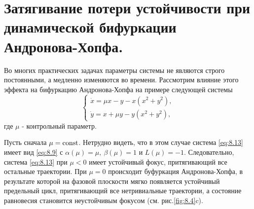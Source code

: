 \section{Затягивание потери устойчивости при динамической бифуркации Андронова-Хопфа.}%
\label{sec:8.4}

Во многих практических задачах параметры системы не являются строго
постоянными, а медленно изменяются во времени. Рассмотрим влияние этого
эффекта на бифуркацию Андронова-Хопфа на примере следующей системы
\begin{equation}
        \label{eq:8.13}
        \begin{cases}
                \dot x = \mu x - y - x(x^2+y^2),\\
                \dot y = x + \mu y - y(x^2+y^2),
        \end{cases}
\end{equation}
где $\mu$ - контрольный параметр.

Пусть сначала $\mu = \textrm{const}$. Нетрудно видеть, что в этом случае система
\eqref{eq:8.13} имеет вид \eqref{eq:8.9} с $\alpha(\mu) = \mu,~\beta(\mu)=1$ и $L(\mu)=-1$.
Следовательно, система \eqref{eq:8.13} при $\mu<0$ имеет устойчивый фокус,
притягивающий все остальные траектории.  При $\mu=0$ происходит буфуркация Андронова-Хопфа, в результате которой на фазовой плоскости мягко появляется устойчивый предельный цикл,
притягивающий все нетривиальные траектории, а состояние равновесия становится неустойчивым фокусом
(см. рис.\ref{fig:8.4}c).

